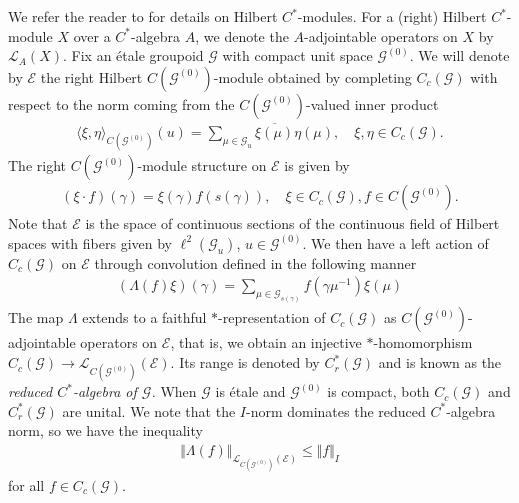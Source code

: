 \documentclass[11pt,a4paper,oneside,final,reqno]{amsart}
\theoremstyle{definition}
\newcommand{\G}{\mathcal{G}}
\newcommand{\Go}{\mathcal{G}^{(0)}}
\newcommand{\E}{\mathcal{E}}
\newcommand{\Cred}{C_{r}^{*}}
\numberwithin{equation}{section}
\begin{document}
	We refer the reader
	to \cite{LanceCstarModulesBook} for details on Hilbert $C^*$-modules.
	For a (right) Hilbert $C^*$-module $X$ over a $C^*$-algebra $A$, we denote the $A$-adjointable operators on $X$ by $\mathcal{L}_A (X)$. 
	Fix an \'etale groupoid $\G$ with compact unit space $\Go$. 
	We will denote by $\E$ the right Hilbert $C(\Go)$-module obtained by completing $C_c (\G)$ with respect to the norm coming from the $C (\Go)$-valued inner product
	\begin{align*}
		\langle \xi , \eta \rangle_{C (\Go)} (u) = \sum_{\mu \in \G_u} \overline{\xi(\mu)} \eta(\mu), \quad \xi, \eta \in C_c (\G).
	\end{align*}
	The right $C (\Go)$-module structure on $\E$ is given by 
	\begin{align*}
		(\xi \cdot f)(\gamma) = \xi(\gamma) f(s(\gamma)), \quad \xi \in C_c(\G), f\in C(\Go).
	\end{align*}
	Note that $\E$ is the space of continuous sections of the continuous field of Hilbert spaces with fibers given by $\ell^2(\G_u)$, $u \in \Go$. 
	We then have a left action of $C_c (\G)$ on $\E$ through convolution defined in the following manner
	\begin{align}\label{eq:left-regular-representation}
		(\Lambda (f) \xi) (\gamma) = \sum_{\mu \in \G_{s(\gamma)}} f(\gamma\mu^{-1}) \xi(\mu)
	\end{align}
	The map $\Lambda$ extends to a faithful $*$-representation of $C_c(\G)$ as $C(\Go)$-adjointable operators on $\E$, that is, we obtain an injective $*$-homomorphism $C_c (\G)\to \mathcal{L}_{C(\Go)}(\E)$. Its range is denoted by $\Cred (\G)$ and is known as the \emph{reduced $C^*$-algebra of $\G$.} When $\G$ is \'etale and $\Go$ is compact, both $C_c(\G)$ and $\Cred(\G)$ are unital. 
	We note that the $I$-norm dominates the reduced $C^*$-algebra norm, so we have the inequality 
	\begin{align*}
		\Vert \Lambda (f) \Vert_{\mathcal{L}_{C(\Go)}(\E)} \leq \Vert f \Vert_I 
	\end{align*}
	for all $f \in C_c(\G)$. 
\end{document}
